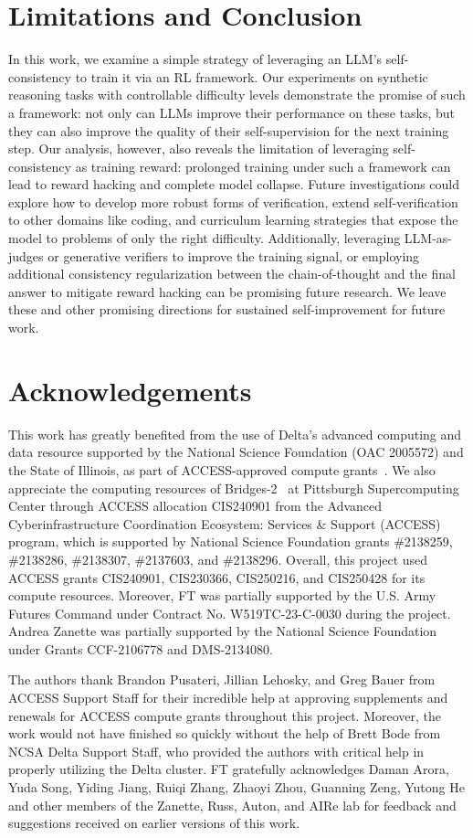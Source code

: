 \section{Limitations and Conclusion}

In this work, we examine a simple strategy of leveraging an LLM's self-consistency to train it via an RL framework. Our experiments on synthetic reasoning tasks with controllable difficulty levels demonstrate the promise of such a framework: not only can LLMs improve their performance on these tasks, but they can also improve the quality of their self-supervision for the next training step. Our analysis, however, also reveals the limitation of leveraging self-consistency as training reward: prolonged training under such a framework can lead to reward hacking and complete model collapse. Future investigations could explore how to develop more robust forms of verification, extend self-verification to other domains like coding, and curriculum learning strategies that expose the model to problems of only the right difficulty. Additionally, leveraging LLM-as-judges or generative verifiers to improve the training signal, or employing additional consistency regularization between the chain-of-thought and the final answer to mitigate reward hacking can be promising future research. We leave these and other promising directions for sustained self-improvement for future work.

\section*{Acknowledgements}
This work has greatly benefited from the use of Delta's advanced computing and data resource supported by the National Science Foundation (OAC 2005572) and the State of Illinois, as part of ACCESS-approved compute grants~\citep{access_compute}. We also appreciate the computing resources of Bridges-2~\citep{psc_computing} at Pittsburgh Supercomputing Center through ACCESS allocation CIS240901 from the Advanced Cyberinfrastructure Coordination Ecosystem: Services \& Support (ACCESS) program, which is supported by National Science Foundation grants \#2138259, \#2138286, \#2138307, \#2137603, and \#2138296. Overall, this project used ACCESS grants CIS240901, CIS230366, CIS250216, and CIS250428 for its compute resources. Moreover, FT was partially supported by the U.S. Army Futures Command under Contract No. W519TC-23-C-0030 during the project. Andrea Zanette was partially supported by the National Science Foundation under Grants CCF-2106778 and DMS-2134080.

The authors thank Brandon Pusateri, Jillian Lehosky, and Greg Bauer from ACCESS Support Staff for their incredible help at approving supplements and renewals for ACCESS compute grants throughout this project. Moreover, the work would not have finished so quickly without the help of Brett Bode from NCSA Delta Support Staff, who provided the authors with critical help in properly utilizing the Delta cluster.  FT gratefully acknowledges Daman Arora, Yuda Song, Yiding Jiang, Ruiqi Zhang, Zhaoyi Zhou, Guanning Zeng, Yutong He and other members of the Zanette, Russ, Auton, and AIRe lab for feedback and suggestions received on earlier versions of this work.
